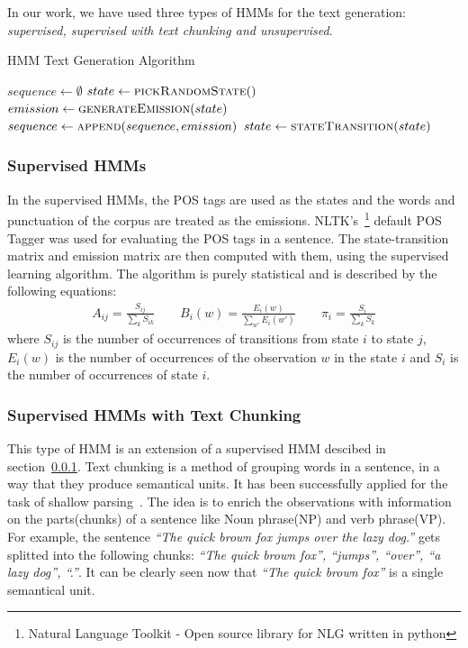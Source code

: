 \documentclass[a4paper,12pt]{article}
\begin{document}
In our work, we have used three types of HMMs for the text generation:
\textit{supervised, supervised with text chunking and unsupervised}.

\begin{algorithm}
\caption{HMM Text Generation Algorithm}
\label{alg:hmm}
\begin{algorithmic}[1]
	\State $sequence \gets \emptyset$
	\State $state \gets \Call{pickRandomState}$
	\Repeat
		\State $emission \gets \Call{generateEmission}{state}$
		\State $sequence \gets \Call{append}{sequence, emission}$
		\State $state \gets \Call{stateTransition}{state}$
	 \\
\end{algorithmic}
\end{algorithm}

\subsubsection{Supervised HMMs}
\label{sec:suphmm}
In the supervised HMMs, the POS tags are used as the states and the words and
punctuation of the corpus are treated as the emissions. NLTK's~\footnote{Natural
Language Toolkit - Open source library for NLG written in python} default POS Tagger was
used for evaluating the POS tags in a sentence. The state-transition matrix and
emission matrix are then computed with them, using the supervised learning
algorithm. The algorithm is purely statistical and is described by the
following equations:
\begin{align*}
A_{ij} = \frac{S_{ij}}{\sum_{k} S_{ik}} \qquad
B_{i}(w) = \frac{E_{i}(w)}{\sum_{w'} E_{i}(w')} \qquad
\pi_{i} = \frac{S_{i}}{\sum_{k} S_{k}}
\end{align*}
where $S_{ij}$ is the number of occurrences of transitions from state $i$ to
state $j$, $E_{i}(w)$ is the number of occurrences of the observation $w$ in the
state $i$ and $S_{i}$ is the number of occurrences of state $i$.

\subsubsection{Supervised HMMs with Text Chunking}
This type of HMM is an extension of a supervised HMM descibed in
section~\ref{sec:suphmm}. Text chunking is a method of grouping words in a
sentence, in a way that they produce semantical units. It has been successfully 
applied for the task of shallow parsing~\cite{hmmchunk}. The idea is to enrich the
observations with information on the parts(chunks) of a sentence like Noun phrase(NP)
and verb phrase(VP). For example, the sentence
\textit{``The quick brown fox jumps over the lazy dog.''} gets splitted into the
following chunks: \textit{``The quick brown fox'', ``jumps'', ``over'', ``a lazy
dog'', ``.''}. It can be clearly seen now that \textit{``The quick brown fox''}
is a single semantical unit.
\end{document}
